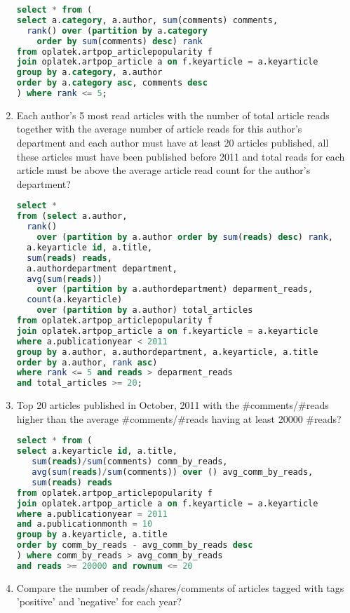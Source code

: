 \begin{enumerate}
\begin{lstlisting}[language=sql]
select * from (
select a.category, a.author, sum(comments) comments, 
  rank() over (partition by a.category 
    order by sum(comments) desc) rank 
from oplatek.artpop_articlepopularity f
join oplatek.artpop_article a on f.keyarticle = a.keyarticle
group by a.category, a.author
order by a.category asc, comments desc
) where rank <= 5;
\end{lstlisting}
\item    Each author's 5 most read articles with the number of total article reads together with the average number of article reads for this author's department and each author must have at least 20 articles published, all these articles must have been published before 2011 and total reads for each article must be above the average article read count for the author's department?
\begin{lstlisting}[language=sql] 
select *
from (select a.author, 
  rank() 
    over (partition by a.author order by sum(reads) desc) rank,
  a.keyarticle id, a.title,
  sum(reads) reads, 
  a.authordepartment department,
  avg(sum(reads)) 
    over (partition by a.authordepartment) deparment_reads,
  count(a.keyarticle) 
    over (partition by a.author) total_articles
from oplatek.artpop_articlepopularity f
join oplatek.artpop_article a on f.keyarticle = a.keyarticle
where a.publicationyear < 2011
group by a.author, a.authordepartment, a.keyarticle, a.title
order by a.author, rank asc)
where rank <= 5 and reads > deparment_reads 
and total_articles >= 20;
\end{lstlisting}
\item    Top 20 articles published in October, 2011 with the \#comments/\#reads higher than the average \#comments/\#reads having at least 20000 \#reads?
\begin{lstlisting}[language=sql] 
select * from (
select a.keyarticle id, a.title,
   sum(reads)/sum(comments) comm_by_reads,
   avg(sum(reads)/sum(comments)) over () avg_comm_by_reads,
   sum(reads) reads
from oplatek.artpop_articlepopularity f
join oplatek.artpop_article a on f.keyarticle = a.keyarticle
where a.publicationyear = 2011 
and a.publicationmonth = 10
group by a.keyarticle, a.title
order by comm_by_reads - avg_comm_by_reads desc
) where comm_by_reads > avg_comm_by_reads 
and reads >= 20000 and rownum <= 20
\end{lstlisting}
\item    Compare the number of reads/shares/comments of articles tagged with tags 'positive' and 'negative' for each year?
\begin{lstlisting}[language=sql] 

\end{lstlisting}
\end{enumerate}
